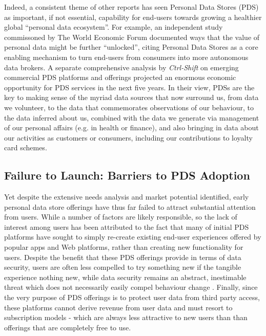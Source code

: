 \documentclass[graybox]{svmult}
\begin{document}

Indeed, a consistent theme of other reports has seen Personal Data Stores (PDS) as important, if not essential, capability for end-users towards growing a healthier global ``personal data ecosystem''.  For example, an independent study commissoned by The World Economic Forum documented ways that the value of personal data might be further ``unlocked'', citing Personal Data Stores as a core enabling mechanism to turn end-users from consumers into more autonomous data brokers\cite{WEF-report}.  A separate comprehensive analysis by \emph{Ctrl-Shift} on emerging commercial PDS platforms and offerings projected an enormous economic opportunity for PDS services in the next five years\cite{ctrlshift}. In their view, PDSs are the key to making sense of the myriad data sources that now surround us, from data we volunteer, to the data that commemorates observations of our behaviour, to the data inferred about us, combined with the data we generate via management of our personal affairs (e.g. in health or finance), and also bringing in data about our activities as customers or consumers, including our contributions to loyalty card schemes.

\subsection{Failure to Launch: Barriers to PDS Adoption}

Yet despite the extensive needs analysis and market potential identified, early personal data store offerings have thus far failed to attract substantial attention from users.  While a number of factors are likely responsible, so the lack of interest among users has been attributed to the fact that many of initial PDS platforms have sought to simply re-create existing end-user experiences offered by popular apps and Web platforms, rather than creating new functionality for users.  Despite the benefit that these PDS offerings provide in terms of data security, users are often less compelled to try something new if the tangible experience nothing new, while data security remains an abstract, inestimable threat which does not necessarily easily compel behaviour change \cite{abstract-threat}.  Finally, since the very purpose of PDS offerings is to protect user data from third party access, these platforms cannot derive revenue from user data and must resort to subscription models - which are always less attractive to new users than than offerings that are completely free to use. 
\end{document}
